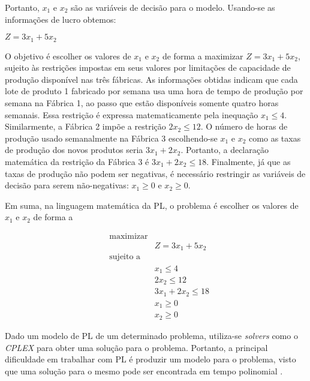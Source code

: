 Portanto, $x_1$ e $x_2$ são as variáveis de decisão para o modelo. Usando-se as informações de lucro obtemos:

\begin{alineas}
\item[] $Z = 3x_1 + 5x_2$
\end{alineas}

O objetivo é escolher os valores de $x_1$ e $x_2$ de forma a maximizar $Z = 3x_1 + 5x_2$, sujeito às restrições impostas em seus valores por limitações de capacidade de produção disponível nas três fábricas. As informações obtidas indicam que cada lote de produto 1 fabricado por semana usa uma hora de tempo de produção por semana na Fábrica 1, ao passo que estão disponíveis somente quatro horas semanais. Essa restrição é expressa matematicamente pela inequação $x_1 \leq 4$. Similarmente, a Fábrica 2 impõe a restrição $2x_2 \leq 12$. O número de horas de produção usado semanalmente na Fábrica 3 escolhendo-se $x_1$ e $x_2$ como as taxas de produção dos novos produtos seria $3x_1 + 2x_2$. Portanto, a declaração matemática da restrição da Fábrica 3 é $3x_1 + 2x_2 \leq 18$. Finalmente, já que as taxas de produção não podem ser negativas, é necessário restringir as variáveis de decisão para serem não-negativas: $x_1 \geq 0$ e $x_2 \geq 0$.

Em suma, na linguagem matemática da PL, o problema é escolher os valores de $x_1$ e $x_2$ de forma a

\begin{equation*}
\begin{aligned}
& \text{maximizar} \\
& &  Z = 3x_1 + 5x_2 \\
& \text{sujeito a} \\
& & x_1 \leq 4 \\
& & 2x_2 \leq 12 \\
& & 3x_1 + 2x_2 \leq 18 \\
& & x_1 \geq 0 \\ 
& & x_2 \geq 0
\end{aligned}
\end{equation*}

Dado um modelo de PL de um determinado problema, utiliza-se \textit{solvers} como o \textit{CPLEX} \cite{ibmcplex} para obter uma solução para o problema. Portanto, a principal dificuldade em trabalhar com PL é produzir um modelo para o problema, visto que uma solução para o mesmo pode ser encontrada em tempo polinomial \cite{luenberger1984linear}.



